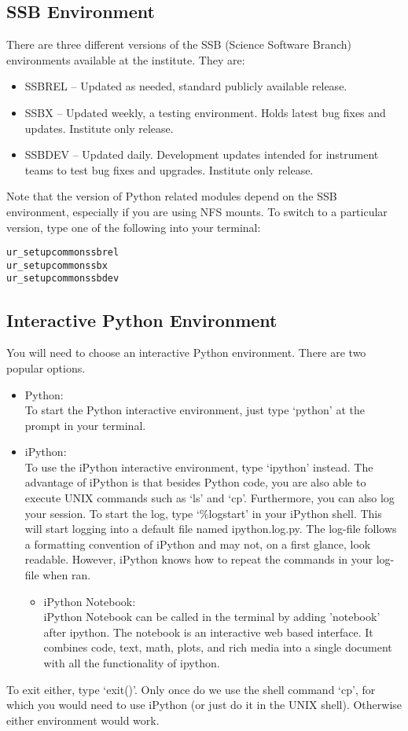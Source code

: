 \subsection{SSB Environment}
There are three different versions of the SSB (Science Software Branch) environments
available at the institute.  They are:
\begin{itemize}
\item  SSBREL -- Updated as needed, standard publicly available release.
\item SSBX -- Updated weekly, a testing environment.  Holds latest
  bug fixes and updates.  Institute only release.
\item SSBDEV -- Updated daily.  Development updates intended for
  instrument teams to test bug fixes and upgrades.  Institute only
  release. 
\end{itemize}
Note that the version of Python related modules depend on the SSB
environment, especially if you are using NFS mounts.  To switch
to a particular version, type one of the following into your terminal: 
\begin{alltt}
\termtab ur_setup common ssbrel
\termtab ur_setup common ssbx
\termtab ur_setup common ssbdev
\end{alltt}

\subsection{Interactive Python Environment}
You will need to choose an interactive Python environment.  There are
two popular options.
\begin{itemize}
\item Python: \\
  To start the Python interactive environment, just type `python' at
  the prompt in your terminal.
\item iPython: \\
  To use the iPython interactive environment, type `ipython' instead.
  The advantage of iPython is that besides Python code, you are also
  able to execute UNIX commands such as `ls' and `cp'.  Furthermore,
  you can also log your session.  To start the log, type `\%logstart'
  in your iPython shell.  This will start logging into a default file
  named ipython.log.py.  The log-file follows a formatting convention
  of iPython and may not, on a first glance, look readable. However,
  iPython knows how to repeat the commands in your log-file when ran.
 	\begin{itemize}
		\item iPython Notebook: \\
  	iPython Notebook can be called in the terminal by adding 'notebook' after ipython.
  	The notebook is an interactive web based interface. It combines code,
	text, math, plots, and rich media into a single document with all the functionality of ipython.
	\end{itemize}

\end{itemize}
To exit either, type `exit()'.  Only once do we use the shell command
`cp', for which you would need to use iPython (or just do it in the
UNIX shell).  Otherwise either environment would work.

